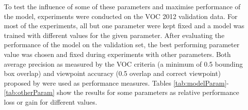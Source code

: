 To test the influence of some of these parameters and maximise performance of the model, experiments were conducted on the VOC 2012 validation data. For most of the experiments, all but one parameter were kept fixed and a model was trained with different values for the given parameter. After evaluating the performance of the model on the validation set, the best performing parameter value was chosen and fixed during experiments with other parameters.  Both average precision as measured by the VOC criteria (a minimum of 0.5 bounding box overlap) and viewpoint accuracy (0.5 overlap and correct viewpoint) proposed by \cite{xiang_wacv14} were used as performance measures. Tables \ref{tab:modelParam}-\ref{tab:otherParam} show the results for some parameters as relative performance loss or gain for different values. 

%
